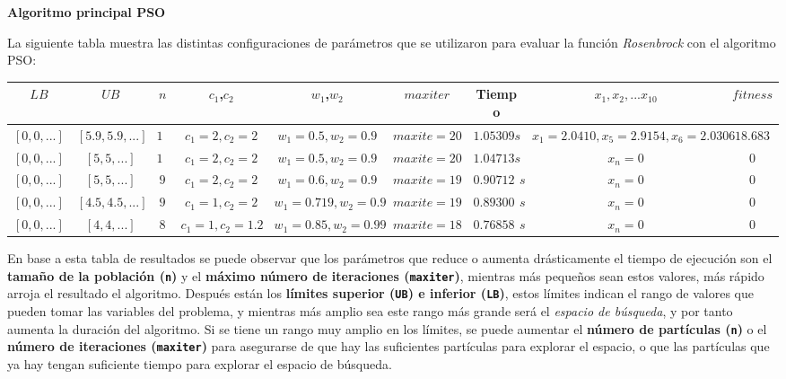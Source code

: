 \documentclass[12pt, a4paper]{article}
\begin{document}
        \textbf{Algoritmo principal PSO}
        

        La siguiente tabla muestra las distintas configuraciones de parámetros que se utilizaron para evaluar la función \emph{Rosenbrock} con el algoritmo PSO:

        \begin{table}[!ht]
            \begin{adjustbox}{width=\textwidth}
                \begin{tabular}{|c|c|c|c|c|c|c|c|c|}
                \rowcolor{yellow}
                \hline
                $LB$ & $UB$ & $n$ & $c_1$,$c_2$ & $w_1$,$w_2$ & $maxiter$ & Tiempo & $x_1,x_2,...x_{10}$ & $fitness$ \\
                \hline
                \([0,0,...]\) & \([5.9,5.9,...]\) & \(10\) & \(c_1=2,c_2=2\) & \(w_1=0.5,w_2=0.9\) & \(maxite=20\) & \(1.05309s\) & \(x_1=2.0410,x_5=2.9154,x_6=2.0306\) & \(18.683\) \\
                \hline
                \([0,0,...]\) & \([5,5,...]\) & \(10\) & \(c_1=2,c_2=2\) & \(w_1=0.5,w_2=0.9\) & \(maxite=20\) & \(1.04713s\) & \(x_n=0\) & \(0\) \\
                \hline
                \([0,0,...]\) & \([5,5,...]\) & \(9\) & \(c_1=2,c_2=2\) & \(w_1=0.6,w_2=0.9\) & \(maxite=19\) & \(0.907121s\) & \(x_n=0\) & \(0\) \\
                \hline
                \([0,0,...]\) & \([4.5,4.5,...]\) & \(9\) & \(c_1=1,c_2=2\) & \(w_1=0.719,w_2=0.9\) & \(maxite=19\) & \(0.893001s\) & \(x_n=0\) & \(0\) \\
                \hline
                \([0,0,...]\) & \([4,4,...]\) & \(8\) & \(c_1=1,c_2=1.2\) & \(w_1=0.85,w_2=0.99\) & \(maxite=18\) & \(0.768587s\) & \(x_n=0\) & \(0\) \\
                \hline
                \end{tabular}
            \end{adjustbox}
        \end{table}

        En base a esta tabla de resultados se puede observar que los parámetros que reduce o aumenta drásticamente el tiempo de ejecución son el \textbf{tamaño de la población (\lstinline{n})} y el \textbf{máximo número de iteraciones (\lstinline{maxiter})}, mientras más pequeños sean estos valores, más rápido arroja el resultado el algoritmo. Después están los \textbf{límites superior (\lstinline{UB}) e inferior (\lstinline{LB})}, estos límites indican el rango de valores que pueden tomar las variables del problema, y mientras más amplio sea este rango más grande será el \emph{espacio de búsqueda}, y por tanto aumenta la duración del algoritmo. Si se tiene un rango muy amplio en los límites, se puede aumentar el \textbf{número de partículas (\lstinline{n})} o el \textbf{número de iteraciones (\lstinline{maxiter})} para asegurarse de que hay las suficientes partículas para explorar el espacio, o que las partículas que ya hay tengan suficiente tiempo para explorar el espacio de búsqueda.
\end{document}
